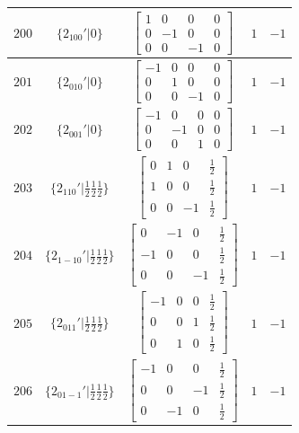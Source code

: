 \documentclass[fleqn,8pt]{jsarticle}
\begin{document}
\begin{longtable}{ccccc}
$ 200 $ & $ \{2{}_{100}{}'|0\} $ & $ \begin{bmatrix} 1 & 0 & 0 & 0 \\ 0 & -1 & 0 & 0 \\ 0 & 0 & -1 & 0 \end{bmatrix} $ & $ 1 $ & $ -1 $ \\ \hline
$ 201 $ & $ \{2{}_{010}{}'|0\} $ & $ \begin{bmatrix} -1 & 0 & 0 & 0 \\ 0 & 1 & 0 & 0 \\ 0 & 0 & -1 & 0 \end{bmatrix} $ & $ 1 $ & $ -1 $ \\ \hline
$ 202 $ & $ \{2{}_{001}{}'|0\} $ & $ \begin{bmatrix} -1 & 0 & 0 & 0 \\ 0 & -1 & 0 & 0 \\ 0 & 0 & 1 & 0 \end{bmatrix} $ & $ 1 $ & $ -1 $ \\ \hline
$ 203 $ & $ \{2{}_{110}{}'|\frac{1}{2} \frac{1}{2} \frac{1}{2}\} $ & $ \begin{bmatrix} 0 & 1 & 0 & \frac{1}{2} \\ 1 & 0 & 0 & \frac{1}{2} \\ 0 & 0 & -1 & \frac{1}{2} \end{bmatrix} $ & $ 1 $ & $ -1 $ \\ \hline
$ 204 $ & $ \{2{}_{1-10}{}'|\frac{1}{2} \frac{1}{2} \frac{1}{2}\} $ & $ \begin{bmatrix} 0 & -1 & 0 & \frac{1}{2} \\ -1 & 0 & 0 & \frac{1}{2} \\ 0 & 0 & -1 & \frac{1}{2} \end{bmatrix} $ & $ 1 $ & $ -1 $ \\ \hline
$ 205 $ & $ \{2{}_{011}{}'|\frac{1}{2} \frac{1}{2} \frac{1}{2}\} $ & $ \begin{bmatrix} -1 & 0 & 0 & \frac{1}{2} \\ 0 & 0 & 1 & \frac{1}{2} \\ 0 & 1 & 0 & \frac{1}{2} \end{bmatrix} $ & $ 1 $ & $ -1 $ \\ \hline
$ 206 $ & $ \{2{}_{01-1}{}'|\frac{1}{2} \frac{1}{2} \frac{1}{2}\} $ & $ \begin{bmatrix} -1 & 0 & 0 & \frac{1}{2} \\ 0 & 0 & -1 & \frac{1}{2} \\ 0 & -1 & 0 & \frac{1}{2} \end{bmatrix} $ & $ 1 $ & $ -1 $ \\ \hline

\end{longtable}
\end{document}
